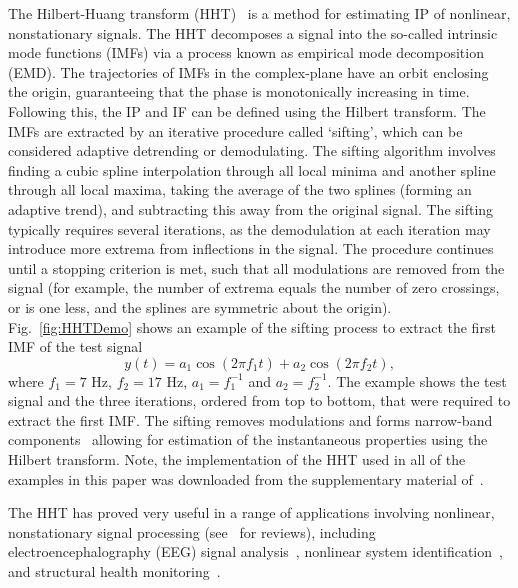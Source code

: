 \documentclass[a4paper]{IEEEtran}
\begin{document}
The Hilbert-Huang transform (HHT)~\cite{Huang1998} is a method for estimating IP of nonlinear, nonstationary signals. The HHT decomposes a signal into the so-called intrinsic mode functions (IMFs) via a process known as empirical mode decomposition (EMD). The trajectories of IMFs in the complex-plane have an orbit enclosing the origin, guaranteeing that the phase is monotonically increasing in time. Following this, the IP and IF can be defined using the Hilbert transform. The IMFs are extracted by an iterative procedure called `sifting', which can be considered adaptive detrending or demodulating. The sifting algorithm involves finding a cubic spline interpolation through all local minima and another spline through all local maxima, taking the average of the two splines (forming an adaptive trend), and subtracting this away from the original signal. The sifting typically requires several iterations, as the demodulation at each iteration may introduce more extrema from inflections in the signal. The procedure continues until a stopping criterion is met, such that all modulations are removed from the signal (for example, the number of extrema equals the number of zero crossings, or is one less, and the splines are symmetric about the origin). Fig.~\ref{fig:HHTDemo} shows an example of the sifting process to extract the first IMF of the test signal
\begin{equation}\label{eq:FirstTestSig}
y\left( t \right) = a_1\cos \left(2\pi f_1t\right) + a_2\cos \left(2\pi f_2t \right),
\end{equation}
where $f_1 = 7$ Hz, $f_2 = 17$ Hz, $a_1 = f_1^{-1}$ and $a_2=f_2^{-1}$. The example shows the test signal and the three iterations, ordered from top to bottom, that were required to extract the first IMF. The sifting removes modulations and forms narrow-band components~\cite{Huang1998} allowing for estimation of the instantaneous properties using the Hilbert transform. Note, the implementation of the HHT used in all of the examples in this paper was downloaded from the supplementary material of~\cite{Wu2009}. 

The HHT has proved very useful in a range of applications involving nonlinear, nonstationary signal processing (see~\cite{Huang2008,Huang2005a} for reviews), including electroencephalography (EEG) signal analysis~\cite{Wang2008}, nonlinear system identification~\cite{Huang2005b}, and structural health monitoring~\cite{Pai2008}.
\end{document}
